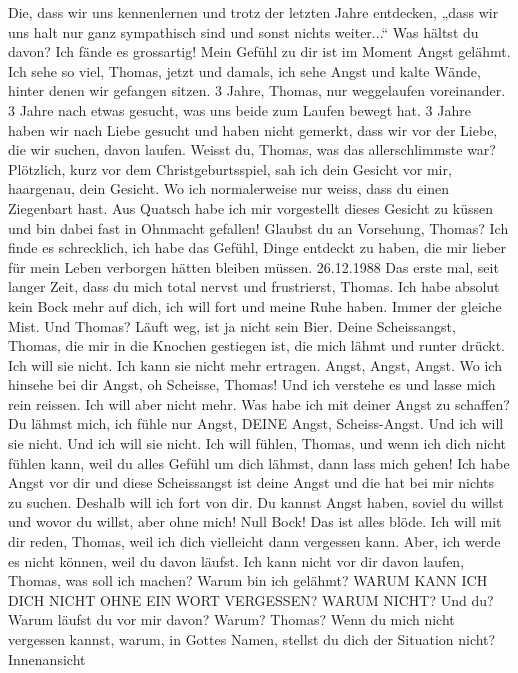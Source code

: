 Die, dass wir uns kennenlernen und trotz der letzten Jahre entdecken, „dass wir uns halt nur ganz sympathisch sind und sonst nichts weiter...“
Was hältst du davon?
Ich fände es grossartig!
Mein Gefühl zu dir ist im Moment Angst gelähmt.
Ich sehe so viel, Thomas, jetzt und damals, ich sehe Angst und kalte Wände, hinter denen wir gefangen sitzen. 3 Jahre, Thomas, nur weggelaufen voreinander.
3 Jahre nach etwas gesucht, was uns beide zum Laufen bewegt hat.
3 Jahre haben wir nach Liebe gesucht und haben nicht gemerkt, dass wir vor der Liebe, die wir suchen, davon laufen.
Weisst du, Thomas, was das allerschlimmste war? Plötzlich, kurz vor dem Christgeburtsspiel, sah ich dein Gesicht vor mir, haargenau, dein Gesicht. Wo ich normalerweise nur weiss, dass du einen Ziegenbart hast.
Aus Quatsch habe ich mir vorgestellt dieses Gesicht zu küssen und bin dabei fast in Ohnmacht gefallen!
Glaubst du an Vorsehung, Thomas?
Ich finde es schrecklich, ich habe das Gefühl, Dinge entdeckt zu haben, die mir lieber für mein Leben verborgen hätten bleiben müssen.
26.12.1988
Das erste mal, seit langer Zeit, dass du mich total nervst und frustrierst, Thomas.
Ich habe absolut kein Bock mehr auf dich, ich will fort und meine Ruhe haben.
Immer der gleiche Mist.
Und Thomas? Läuft weg, ist ja nicht sein Bier.
Deine Scheissangst, Thomas, die mir in die Knochen gestiegen ist, die mich lähmt und runter drückt.
Ich will sie nicht.
Ich kann sie nicht mehr ertragen.
Angst, Angst, Angst. Wo ich hinsehe bei dir Angst, oh Scheisse, Thomas!
Und ich verstehe es und lasse mich rein reissen.
Ich will aber nicht mehr.
Was habe ich mit deiner Angst zu schaffen?
Du lähmst mich, ich fühle nur Angst, DEINE Angst, Scheiss-Angst.
Und ich will sie nicht.
Und ich will sie nicht.
Ich will fühlen, Thomas, und wenn ich dich nicht fühlen kann, weil du alles Gefühl um dich lähmst, dann lass mich gehen!
Ich habe Angst vor dir und diese Scheissangst ist deine Angst und die hat bei mir nichts zu suchen. Deshalb will ich fort von dir. Du kannst Angst haben, soviel du willst und wovor du willst, aber ohne mich!
Null Bock!
Das ist alles blöde. Ich will mit dir reden, Thomas, weil ich dich vielleicht dann vergessen kann. Aber, ich werde es nicht können, weil du davon läufst.
Ich kann nicht vor dir davon laufen, Thomas, was soll ich machen?
Warum bin ich gelähmt?
WARUM KANN ICH DICH NICHT OHNE EIN WORT VERGESSEN? WARUM NICHT?
Und du? Warum läufst du vor mir davon? Warum?
Thomas? Wenn du mich nicht vergessen kannst, warum, in Gottes Namen, stellst  du dich der Situation nicht?
Innenansicht 


